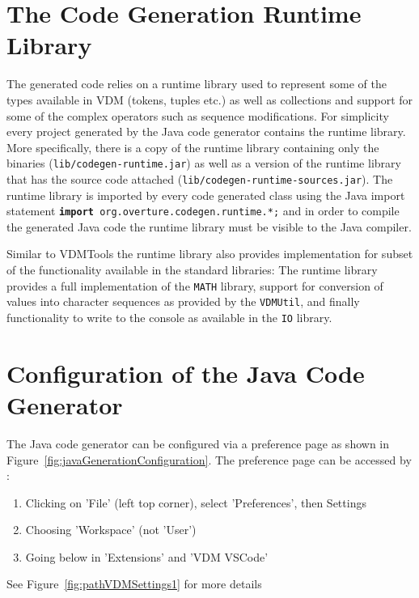 \section{The Code Generation Runtime Library}

The generated code relies on a runtime library used to represent some
of the types available in VDM (tokens, tuples etc.) as well as
collections and support for some of the complex operators such as
sequence modifications. For simplicity every project generated
by the Java code generator contains the runtime library. More
specifically, there is a copy of the runtime library containing only
the binaries (\texttt{lib/codegen-runtime.jar}) as well as a version
of the runtime library that has the source code attached
(\texttt{lib/codegen-runtime-sources.jar}). The runtime library is
imported by every code generated class using the Java import statement
\texttt{\textbf{import} org.overture.codegen.runtime.*;} and in order
to compile the generated Java code the runtime library must be visible
to the Java compiler.

Similar to VDMTools the runtime library also provides implementation
for subset of the functionality available in the standard libraries:
The runtime library provides a full implementation of the
\texttt{MATH} library, support for conversion of values into character
sequences as provided by the \texttt{VDMUtil}, and finally
functionality to write to the console as available in the \texttt{IO}
library.

\section{Configuration of the Java Code Generator}

The Java code generator can be configured via a preference page as shown in Figure~\ref{fig:javaGenerationConfiguration}. The
preference page can be accessed by :
\begin{enumerate}
    \item Clicking on 'File' (left top corner), select 'Preferences', then Settings
    \item Choosing 'Workspace' (not 'User')
    \item Going below in 'Extensions' and 'VDM VSCode'
\end{enumerate}
See Figure~\ref{fig:pathVDMSettings1} for more details


